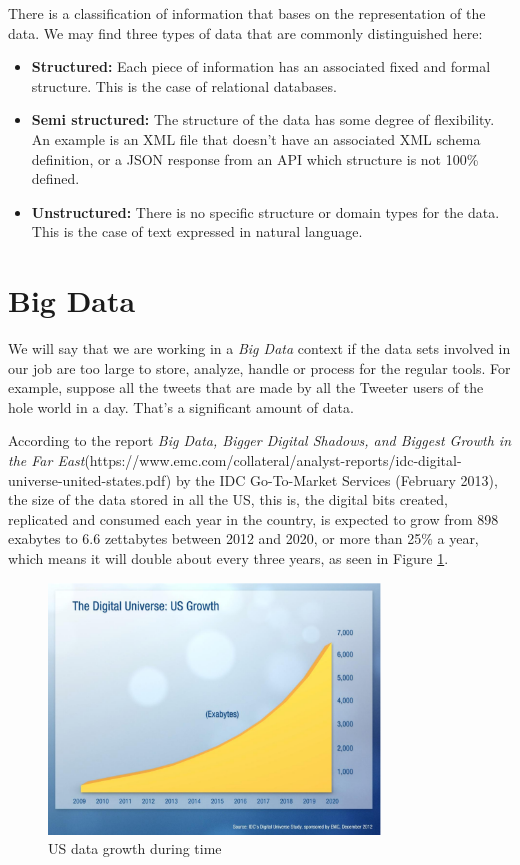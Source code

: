 \documentclass[%
 reprint,
 amsmath,amssymb,
 aps,
]{revtex4-1}
\begin{document}
There is a classification of information that bases on the representation of the data. We may find three types of data that are commonly distinguished here:

\begin{itemize}
  \item \textbf{Structured:} Each piece of information has an associated fixed and formal structure. This is the case of relational databases.
  \item \textbf{Semi structured:} The structure of the data has some degree of flexibility. An example is an XML file that doesn't have an associated XML schema definition, or a JSON response from an API which structure is not 100\% defined.
  \item \textbf{Unstructured:} There is no specific structure or domain types for the data. This is the case of text expressed in natural language.
\end{itemize}

\section{\label{sec:level1}Big Data}

We will say that we are working in a \emph{Big Data} context if the data sets involved in our job are too large to store, analyze, handle or process for the regular tools. For example, suppose all the tweets that are made by all the Tweeter users of the hole world in a day. That's a significant amount of data.

According to the report \emph{Big Data, Bigger Digital Shadows, and Biggest Growth in the Far East}(https://www.emc.com/collateral/analyst-reports/idc-digital-universe-united-states.pdf) by the IDC Go-To-Market Services (February 2013), the size of the data stored in all the US, this is, the digital bits created, replicated and consumed each year in the country, is expected to grow from 898 exabytes to 6.6 zettabytes between 2012 and 2020, or more than 25\% a year, which means it will double about every three years, as seen in Figure \ref{fig:data-increase}.

\begin{figure}[h]
  \includegraphics[width=8.8cm]{data-increase.png}
  \centering
  \caption{US data growth during time}
  \label{fig:data-increase}
\end{figure}
\end{document}
